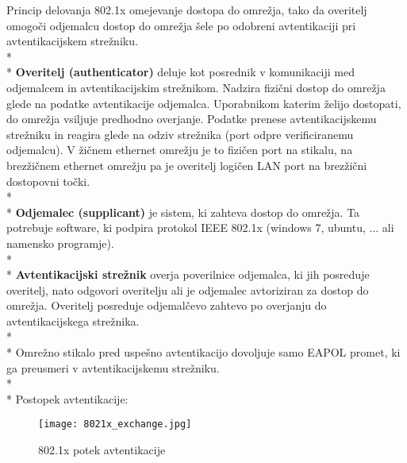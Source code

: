 \documentclass[12pt]{article}
\begin{document}
Princip delovanja 802.1x omejevanje dostopa do omrežja, tako da overitelj omogoči odjemalcu dostop do omrežja šele po odobreni avtentikaciji pri avtentikacijskem strežniku. 
\\*
\\* \indent
\textbf{Overitelj (authenticator)} deluje kot posrednik v komunikaciji med odjemalcem in avtentikacijskim strežnikom. Nadzira fizični dostop do omrežja glede na podatke avtentikacije odjemalca. Uporabnikom katerim želijo dostopati, do omrežja vsiljuje predhodno overjanje. Podatke prenese avtentikacijskemu strežniku in reagira glede na odziv strežnika (port odpre verificiranemu odjemalcu). V žičnem ethernet omrežju je to fizičen port na stikalu, na brezžičnem ethernet omrežju pa je overitelj logičen LAN port na brezžični dostopovni točki.
\\*
\\* \indent
\textbf{Odjemalec (supplicant)} je sistem, ki zahteva dostop do omrežja. Ta potrebuje software, ki podpira protokol IEEE 802.1x (windows 7, ubuntu, ... ali namensko programje).
\\*
\\* \indent
\textbf{Avtentikacijski strežnik} overja poverilnice odjemalca, ki jih posreduje overitelj, nato odgovori overitelju ali je odjemalec avtoriziran za dostop do omrežja. Overitelj posreduje odjemalčevo zahtevo po overjanju do avtentikacijskega strežnika.
\\*
\\* \indent
Omrežno stikalo pred uspešno avtentikacijo dovoljuje samo EAPOL promet, ki ga preusmeri v avtentikacijskemu strežniku.
\\*
\\*
Postopek avtentikacije:

\begin{figure}[htb]
\begin{center}
\texttt{[image: 8021x\_exchange.jpg]}
\end{center}
\caption{802.1x potek avtentikacije}
\label{802.1x_exchange}
\end{figure}
\end{document}
